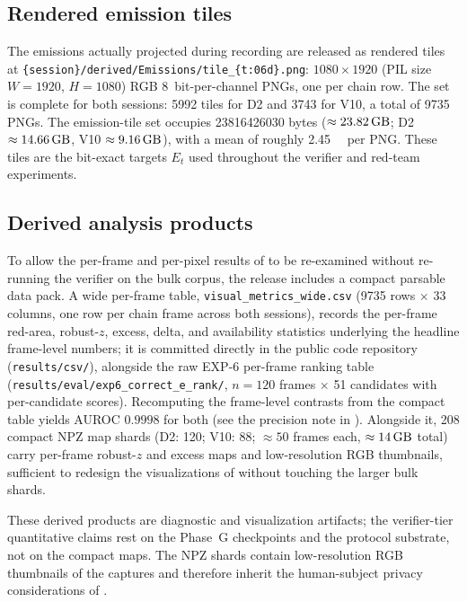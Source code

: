 \subsection{Rendered emission tiles}
\label{sec:availability:emissions}

The emissions actually projected during recording are released as rendered tiles at \texttt{\{session\}/derived/Emissions/tile\_\{t:06d\}.png}: $1080 \times 1920$ (PIL size $W{=}1920$, $H{=}1080$) RGB \SI{8}{bit}-per-channel PNGs, one per chain row. The set is complete for both sessions: \num{5992} tiles for D2 and \num{3743} for V10, a total of \num{9735} PNGs. The emission-tile set occupies \num{23816426030} bytes ($\approx \SI{23.82}{\giga\byte}$; D2 $\approx \SI{14.66}{\giga\byte}$, V10 $\approx \SI{9.16}{\giga\byte}$), with a mean of roughly \SI{2.45}{\mega\byte} per PNG. These tiles are the bit-exact targets $E_t$ used throughout the verifier and red-team experiments.

\subsection{Derived analysis products}
\label{sec:availability:derived}

To allow the per-frame and per-pixel results of  to be re-examined without re-running the verifier on the bulk corpus, the release includes a compact parsable data pack. A wide per-frame table, \texttt{visual\_metrics\_wide.csv} (\num{9735} rows $\times$ 33 columns, one row per chain frame across both sessions), records the per-frame red-area, robust-$z$, excess, delta, and availability statistics underlying the headline frame-level numbers; it is committed directly in the public code repository (\texttt{results/csv/}), alongside the raw EXP-6 per-frame ranking table (\texttt{results/eval/exp6\_correct\_e\_rank/}, $n=120$ frames $\times$ 51 candidates with per-candidate scores). Recomputing the frame-level contrasts from the compact table yields AUROC $0.9998$ for both (see the precision note in ). Alongside it, 208 compact NPZ map shards (D2: 120; V10: 88; $\approx 50$ frames each, $\approx \SI{14}{\giga\byte}$ total) carry per-frame robust-$z$ and excess maps and low-resolution RGB thumbnails, sufficient to redesign the visualizations of  without touching the larger bulk shards.

These derived products are diagnostic and visualization artifacts; the verifier-tier quantitative claims rest on the Phase~G checkpoints and the protocol substrate, not on the compact maps. The NPZ shards contain low-resolution RGB thumbnails of the captures and therefore inherit the human-subject privacy considerations of .

